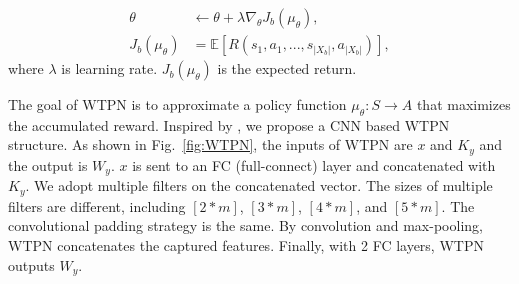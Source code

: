\begin{align}
\theta &\leftarrow \theta + \lambda \nabla_\theta J_b(\mu_\theta),\\
J_b(\mu_\theta) &= \mathbb{E} [R(s_1, a_1, ..., s_{|X_b|},a_{|X_b|}) ],
\end{align}
where $\lambda$ is learning rate. $J_b(\mu_\theta)$ is the expected return.

The goal of WTPN is to approximate a policy function $\mu_\theta :S \to A$ that maximizes the accumulated reward.  Inspired by \cite{DBLP:conf/aaai/KimJSR16}, we propose a CNN based WTPN structure. As shown in Fig.~\ref{fig:WTPN}, the inputs of WTPN are $x$ and $K_y$ and the output is $W_y$. $x$ is sent to an FC (full-connect) layer and concatenated with $K_y$. We adopt multiple filters on the concatenated vector. The sizes of multiple filters are different, including  $[2*m]$, $[3*m]$, $[4*m]$, and $[5*m]$. The convolutional padding strategy is the same. By convolution and max-pooling, WTPN concatenates the captured features. Finally, with 2 FC layers, WTPN outputs $W_y$. 